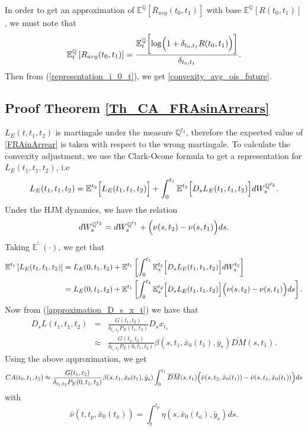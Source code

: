 \documentclass[a4paper,10pt]{article}
\newcommand{\1}{\mathbf{1}}
\begin{document}
In order to get an approximation of $\mathbb{E}^{\mathbb{Q}}\left[R_{avg}(t_0,t_1)\right]$ with base $\mathbb{E}^{\mathbb{Q}}\left[R(t_0,t_1)\right]$, we must note that 
\begin{equation*}
\mathbb{E}_t^{\mathbb{Q}}\left[R_{avg}(t_0,t_1)\right] = \frac{\mathbb{E}_t^{\mathbb{Q}}\biggl[ \log\Bigl(1+ \delta_{t_0,t_1} R(t_0,t_1)\Bigr)\biggr]}{ \delta_{t_0,t_1}}.
\end{equation*}
Then from (\ref{representation_i_0_t}), we get \eqref{convexity_avg_ois_future}.

\subsection{Proof Theorem \ref{Th_CA_FRAsinArrears}}\label{Proof_CA_FRAsinArrears}
$L_{E}(t,t_1,t_2)$ is martingale under the measure $\mathbb{Q}^{t_2}$, therefore the expected value of \eqref{FRAinArrear} is taken with respect to the wrong martingale. To calculate the convexity adjustment, we use the Clark-Ocone formula to get a representation for $L_{E}(t_1,t_1,t_2)$, i.e
\begin{equation}\label{general_convexity_fras}
L_{E}(t_1,t_1,t_2) = \mathbb{E}^{t_2}\Bigl[L_{E}(t_1,t_1,t_2) \Bigr] + \int_{0}^{t_1} \mathbb{E}^{t_2}\Bigl[D_s L_{E}(t_1,t_1,t_2) \Bigr] dW^{\mathbb{Q}^{t_2}}_{s}.
\end{equation}
Under the HJM dynamics, we have the relation
\begin{equation*}
dW^{\mathbb{Q}^{t_2}}_s = dW^{\mathbb{Q}^{t_1}}_s + \Bigl(\nu(s,t_2) - \nu(s,t_1)\Bigr) ds. 
\end{equation*}
Taking $\mathbb{E}^{^{t_1}}(\cdot)$, we get that
\begin{align*}
\mathbb{E}^{t_1}\left[L_{E}(t_1,t_1,t_2) \right] &= L_{E}(0,t_1,t_2) + \mathbb{E}^{t_1}\left[ \int_{0}^{t_1} \mathbb{E}_s^{t_2}\Bigl[D_s L_{E}(t_1,t_1,t_2)\Bigr] dW^{t_2}_{s}\right]\\
&= L_{E}(0,t_1,t_2) + \mathbb{E}^{t_1}\left[ \int_{0}^{t_1} \mathbb{E}_s^{t_2}\Bigl[D_s L_{E}(t_1,t_1,t_2) \Bigr] \Bigl(\nu(s,t_2)-\nu(s,t_1)\Bigr) ds \right].
\end{align*}
Now from (\ref{approximation_D_s_x_t}) we have that 
\begin{eqnarray*}
D_s L(t_1,t_1,t_2) &=& \frac{G(t_1,t_2)}{\delta_{t_1,t_2}P_{E}(t_1,t_2)} D_s x_{t_1}\\
&\approx& \frac{G(t_1,t_2)}{\delta_{t_1,t_2}P_{E}(0,t_1,t_2)} \beta(s,t_1, \bar{x}_0(t_1), \bar{y}_s)\overline{DM}(s,t_1).
\end{eqnarray*}
Using the above approximation, we get
\begin{equation*}
CA(t_0,t_1,t_2) \approx \frac{G(t_1,t_2)}{\delta_{t_1,t_2}P_{E}(0,t_1,t_2)} \beta(s,t_1, \bar{x}_0(t_1), \bar{y}_s) \int_{0}^{t_1} \overline{DM}(s,t_1) \Bigl(\bar{\nu}(s,t_2,\bar{x}_{0}(t_1))-\bar{\nu}(s,t_1,\bar{x}_{0}(t_1))\Bigr) ds
\end{equation*}
with 
\begin{equation*}
\bar{\nu}(t,t_p, \bar{x}_0(t_a))= \int_{t}^{t_p} \eta(s,\bar{x}_0(t_a),\bar{y}_s) ds.   
\end{equation*}
\end{document}
